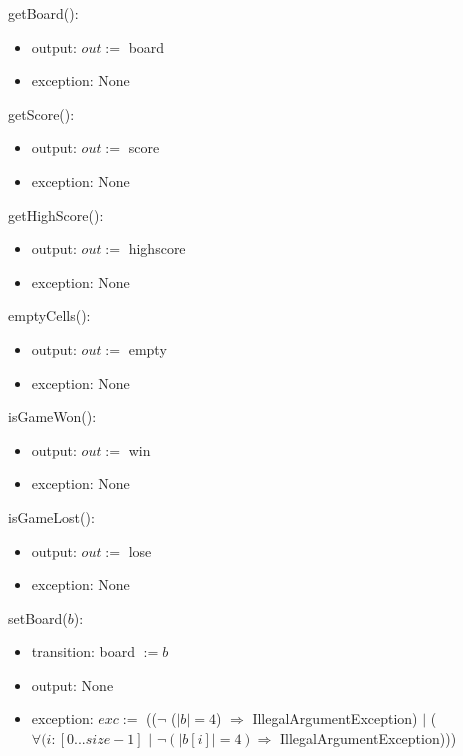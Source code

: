 \documentclass[12pt]{article}
\begin{document}
\noindent getBoard():
\begin{itemize}
\item output: $out :=$ board
\item exception: None
\end{itemize}

\noindent getScore():
\begin{itemize}
\item output: $out :=$ score
\item exception: None
\end{itemize}

\noindent getHighScore():
\begin{itemize}
\item output: $out :=$ highscore
\item exception: None
\end{itemize}

\noindent emptyCells():
\begin{itemize}
\item output: $out :=$ empty
\item exception: None
\end{itemize}

\noindent isGameWon():
\begin{itemize}
\item output: $out :=$ win
\item exception: None
\end{itemize}

\noindent isGameLost():
\begin{itemize}
\item output: $out :=$ lose
\item exception: None
\end{itemize}

\noindent setBoard($b$):
\begin{itemize}
  \item transition: board $:= b$ 
  \item output: None
  \item exception: $exc :=$ (($\neg$ ($|b| = 4$) 
  $\Rightarrow$ IllegalArgumentException) $|$ 
  ($\forall(i : [0...size-1]$ $|$ $\neg (|b[i]| = 4) \Rightarrow$ IllegalArgumentException)))
\end{itemize}
\end{document}
